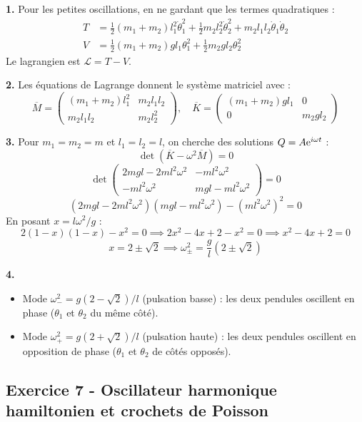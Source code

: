 \documentclass[12pt,a4paper]{article}
\begin{document}
\begin{boitecorrige}
\textbf{1.} Pour les petites oscillations, en ne gardant que les termes quadratiques :
\begin{align*}
T &= \frac{1}{2}(m_1+m_2)l_1^2\dot\theta_1^2 + \frac{1}{2}m_2 l_2^2\dot\theta_2^2 + m_2 l_1 l_2\dot\theta_1\dot\theta_2\\
V &= \frac{1}{2}(m_1+m_2)g l_1\theta_1^2 + \frac{1}{2}m_2 g l_2\theta_2^2
\end{align*}
Le lagrangien est $\mathcal{L} = T - V$.

\textbf{2.} Les équations de Lagrange donnent le système matriciel avec :
\[
\overline{M} = \begin{pmatrix}(m_1+m_2)l_1^2 & m_2 l_1 l_2\\ m_2 l_1 l_2 & m_2 l_2^2\end{pmatrix}, \quad
\overline{K} = \begin{pmatrix}(m_1+m_2)g l_1 & 0\\ 0 & m_2 g l_2\end{pmatrix}
\]

\textbf{3.} Pour $m_1=m_2=m$ et $l_1=l_2=l$, on cherche des solutions $Q = A\mathrm{e}^{i\omega t}$ :
\[
\det(\overline{K}-\omega^2\overline{M}) = 0
\]
\[
\det\begin{pmatrix}2mgl - 2ml^2\omega^2 & -ml^2\omega^2\\ -ml^2\omega^2 & mgl-ml^2\omega^2\end{pmatrix} = 0
\]
\[
(2mgl-2ml^2\omega^2)(mgl-ml^2\omega^2) - (ml^2\omega^2)^2 = 0
\]
En posant $x = l\omega^2/g$ :
\[
2(1-x)(1-x) - x^2 = 0 \implies 2x^2 - 4x + 2 - x^2 = 0 \implies x^2 - 4x + 2 = 0
\]
\[
x = 2\pm\sqrt{2} \implies \boxed{\omega_\pm^2 = \frac{g}{l}(2\pm\sqrt{2})}
\]

\textbf{4.}
\begin{itemize}
  \item Mode $\omega_-^2 = g(2-\sqrt{2})/l$ (pulsation basse) : les deux pendules oscillent en phase ($\theta_1$ et $\theta_2$ du même côté).
  \item Mode $\omega_+^2 = g(2+\sqrt{2})/l$ (pulsation haute) : les deux pendules oscillent en opposition de phase ($\theta_1$ et $\theta_2$ de côtés opposés).
\end{itemize}
\end{boitecorrige}

\subsection*{Exercice 7 - Oscillateur harmonique hamiltonien et crochets de Poisson \niveau{\moyen}}
\end{document}
